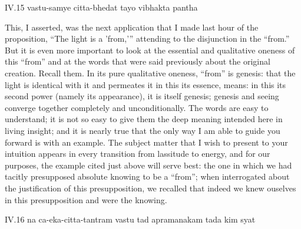 IV.15
vastu-samye citta-bhedat tayo vibhakta pantha

This, I asserted, was the next application
that I made last hour of the proposition,
“The light is a 'from,'” attending to
the disjunction in the “from.”
But it is even more important to look at
the essential and qualitative oneness of this “from”
and at the words that were said previously
about the original creation.
Recall them.
In its pure qualitative oneness,
“from” is genesis:
that the light is identical with it
and permeates it in this its essence, means:
in this its second power (namely its appearance),
it is itself genesis;
genesis and seeing converge together
completely and unconditionally.
The words are easy to understand;
it is not so easy to give them the deep meaning
intended here in living insight;
and it is nearly true that the only way
I am able to guide you forward is with an example.
The subject matter that I wish to
present to your intuition appears
in every transition from lassitude to energy,
and for our purposes,
the example cited just above will serve best:
the one in which we had tacitly presupposed
absolute knowing to be a “from”;
when interrogated about the justification
of this presupposition,
we recalled that indeed we knew ouselves
in this presupposition and were the knowing.

IV.16
na ca-eka-citta-tantram vastu tad apramanakam tada kim syat

